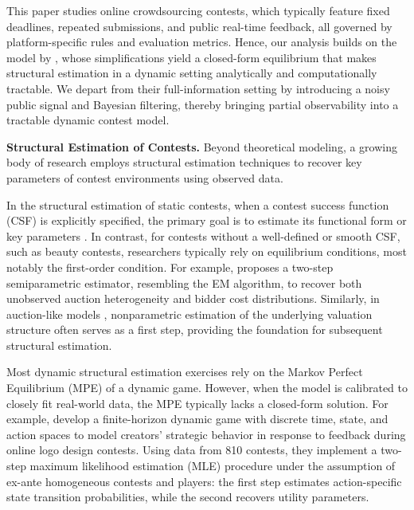 \documentclass[mnsc]{informs3}
\begin{document}
This paper studies online crowdsourcing contests, which typically feature fixed deadlines, repeated submissions, and public real-time feedback, all governed by platform-specific rules and evaluation metrics.
Hence, our analysis builds on the model by \citet{Ryvkin2022Fight}, whose simplifications yield a closed-form equilibrium that makes structural estimation in a dynamic setting analytically and computationally tractable.
We depart from their full-information setting by introducing a noisy public signal and Bayesian filtering, thereby bringing partial observability into a tractable dynamic contest model.



\textbf{Structural Estimation of Contests.}
Beyond theoretical modeling, a growing body of research employs structural estimation techniques to recover key parameters of contest environments using observed data.

In the structural estimation of static contests, when a contest success function (CSF) is explicitly specified, the primary goal is to estimate its functional form or key parameters \citep{hwang2012technology, kang2016policy, huang2021structural}.
In contrast, for contests without a well-defined or smooth CSF, such as beauty contests, researchers typically rely on equilibrium conditions, most notably the first-order condition.
For example, \citet{yoganarasimhan2016estimation} proposes a two-step semiparametric estimator, resembling the EM algorithm, to recover both unobserved auction heterogeneity and bidder cost distributions.
Similarly, in auction-like models \citep{guerre2000optimal, shakhgildyan2022nonparametric}, nonparametric estimation of the underlying valuation structure often serves as a first step, providing the foundation for subsequent structural estimation.

Most dynamic structural estimation exercises rely on the Markov Perfect Equilibrium (MPE) of a dynamic game.
However, when the model is calibrated to closely fit real-world data, the MPE typically lacks a closed-form solution.
For example, \citet{jiang2022feedback} develop a finite-horizon dynamic game with discrete time, state, and action spaces to model creators’ strategic behavior in response to feedback during online logo design contests.
Using data from 810 contests, they implement a two-step maximum likelihood estimation (MLE) procedure under the assumption of ex-ante homogeneous contests and players: the first step estimates action-specific state transition probabilities, while the second recovers utility parameters.
\end{document}

